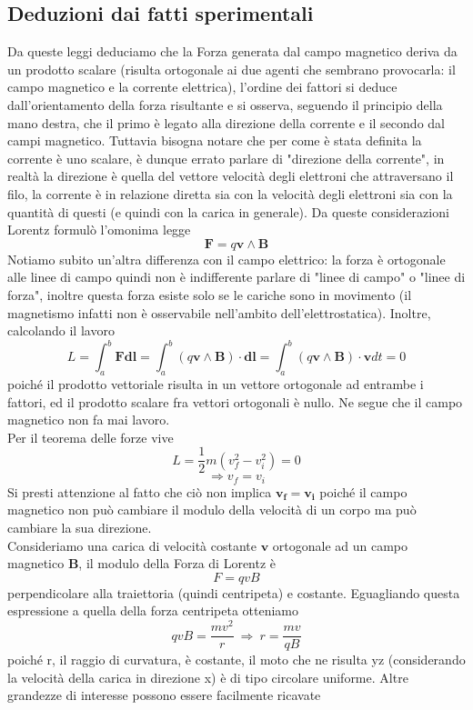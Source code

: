 \documentclass[
10pt, %
a4paper, %
oneside, %
headinclude,footinclude, %
BCOR5mm, %
]{scrartcl}
\begin{document}
\subsection{Deduzioni dai fatti sperimentali}
Da queste leggi deduciamo che la Forza generata dal campo magnetico deriva da un prodotto scalare (risulta ortogonale ai due agenti che sembrano provocarla: il campo magnetico e la corrente elettrica), l'ordine dei fattori si deduce dall'orientamento della forza risultante e si osserva, seguendo il principio della mano destra, che il primo è legato alla direzione della corrente e il secondo dal campi magnetico. Tuttavia bisogna notare che per come è stata definita la corrente è uno scalare, è dunque errato parlare di "direzione della corrente", in realtà la direzione è quella del vettore velocità degli elettroni che attraversano il filo, la corrente è in relazione diretta sia con la velocità degli elettroni sia con la quantità di questi (e quindi con la carica in generale). Da queste considerazioni Lorentz formulò l'omonima legge
\[\mathbf{F}=q\mathbf{v}\wedge\mathbf{B}\]
Notiamo subito un'altra differenza con il campo elettrico: la forza è ortogonale alle linee di campo quindi non è indifferente parlare di "linee di campo" o "linee di forza", inoltre questa forza esiste solo se le cariche sono in movimento (il magnetismo infatti non è osservabile nell'ambito dell'elettrostatica). Inoltre, calcolando il lavoro
\[L = \int_a^b \mathbf{F}\mathbf{dl}=\int_a^b (q\mathbf{v}\wedge\mathbf{B})\cdot \mathbf{dl}= \int_a^b (q\mathbf{v}\wedge\mathbf{B})\cdot \mathbf{v}dt= 0 \]
poiché il prodotto vettoriale risulta in un vettore ortogonale ad entrambe i fattori, ed il prodotto scalare fra vettori ortogonali è nullo. Ne segue che il campo magnetico non fa mai lavoro.\\
Per il teorema delle forze vive 
\[L = \frac{1}{2}m(v_f^2-v_i^2) = 0 \]
\[\Rightarrow v_f = v_i\]
Si presti attenzione al fatto che ciò non implica \(\mathbf{v_f} = \mathbf{v_i}\) poiché il campo magnetico non può cambiare il modulo della velocità di un corpo ma può cambiare la sua direzione.\\
Consideriamo una carica di velocità costante $\mathbf{v}$ ortogonale ad un campo magnetico $\mathbf{B}$, il modulo della Forza di Lorentz è
\[F = qvB\]
perpendicolare alla traiettoria (quindi centripeta) e costante. Eguagliando questa espressione a quella della forza centripeta otteniamo
\[qvB=\frac{mv^2}{r}\ \Rightarrow\ r=\frac{mv}{qB}\]
poiché r, il raggio di curvatura, è costante, il moto che ne risulta yz (considerando la velocità della carica in direzione x) è di tipo circolare uniforme. Altre grandezze di interesse possono essere facilmente ricavate
\end{document}
